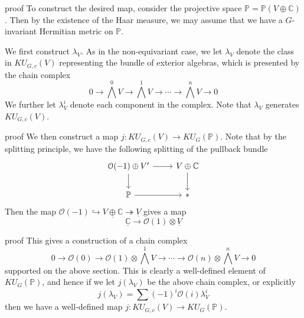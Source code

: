 \documentclass{beamer}
\newcommand{\inj}{\hookrightarrow}
\newcommand{\surj}{\twoheadrightarrow}
\newcommand{\lto}{\longrightarrow}
\begin{document}
\begin{frame}
	\begin{block}{proof}
		To construct the desired map, consider the projective space $\mathbb{P}=\mathbb{P}(V\oplus\mathbb{C})$. Then by the existence of the Haar measure, we may assume that we have a $G$-invariant Hermitian metric on $\mathbb{P}$. 
		
		We first construct $\lambda_V$. As in the non-equivariant case, we let $\lambda_V$ denote the class in $KU_{G,c}(V)$ representing the bundle of exterior algebras, which is presented by the chain complex 
		\[ 0\to\bigwedge^0V\to\bigwedge^1V\to\cdots\to\bigwedge^nV\to0 \]
		We further let $\lambda^i_V$ denote each component in the complex. Note that $\lambda_V$ generates $KU_{G,c}(V)$. 
	\end{block}
\end{frame}

\begin{frame}
	\begin{block}{proof}
		We then construct a map $j:KU_{G,c}(V)\to KU_G(\mathbb{P})$. Note that by the splitting principle, we have the following splitting of the pullback bundle 
		\[\begin{tikzcd}[ampersand replacement=\&]
			{\mathcal{O}(-1)\oplus V'} \& {V\oplus\mathbb{C}} \\
			{\mathbb{P}} \& {*}
			\arrow[from=1-1, to=1-2]
			\arrow[from=1-1, to=2-1]
			\arrow[from=1-2, to=2-2]
			\arrow[from=2-1, to=2-2]
		\end{tikzcd}\]
		Then the map $\mathcal{O}(-1)\inj\underline{V\oplus\mathbb{C}}\surj\underline{V}$ gives a map 
		\[ \underline{\mathbb{C}}\to\mathcal{O}(1)\otimes\underline{V} \] 
	\end{block}
\end{frame}

\begin{frame}
	\begin{block}{proof}
		This gives a construction of a chain complex 
		\[ 0\lto\mathcal{O}(0)\lto\mathcal{O}(1)\otimes\bigwedge^1V\lto\cdots\lto\mathcal{O}(n)\otimes\bigwedge^nV\lto 0 \]
		supported on the above section. This is clearly a well-defined element of $KU_G(\mathbb{P})$, and hence if we let $j(\lambda_V)$ be the above chain complex, or explicitly 
		\[ j(\lambda_V)=\sum(-1)^i\mathcal{O}(i)\lambda^i_V \]
		then we have a well-defined map $j:KU_{G,c}(V)\to KU_G(\mathbb{P})$. 
	\end{block}
\end{frame}
\end{document}
